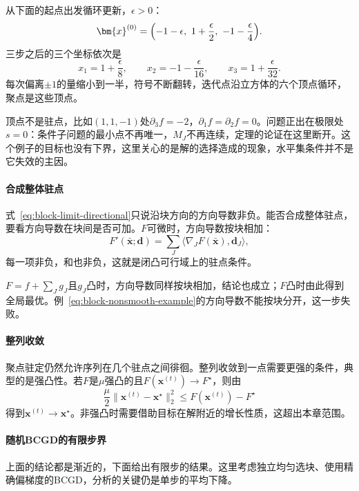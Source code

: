 从下面的起点出发循环更新，$\epsilon>0$：
\[
 \bm{x}^{(0)}=\Bigl(-1-\epsilon,\ 1+\frac{\epsilon}{2},\ -1-\frac{\epsilon}{4}\Bigr).
\]
三步之后的三个坐标依次是
\[
 x_1=1+\frac{\epsilon}{8},\qquad x_2=-1-\frac{\epsilon}{16},\qquad x_3=1+\frac{\epsilon}{32}.
\]
每次偏离$\pm1$的量缩小到一半，符号不断翻转，迭代点沿立方体的六个顶点循环，聚点是这些顶点。

顶点不是驻点，比如$(1,1,-1)$处$\partial_3f=-2$，$\partial_1f=\partial_2f=0$。问题正出在极限处$s=0$：条件子问题的最小点不再唯一，$M_J$不再连续，定理的论证在这里断开。这个例子的目标也没有下界，这里关心的是解的选择造成的现象，水平集条件并不是它失效的主因。

\paragraph{合成整体驻点}
式~\eqref{eq:block-limit-directional}只说沿块方向的方向导数非负。能否合成整体驻点，要看方向导数在块间是否可加。$F$可微时，方向导数按块相加：
\[
 F'(\bar{\bm{x}};\bm{d})=\sum_J\langle\nabla_JF(\bar{\bm{x}}),\bm{d}_J\rangle ,
\]
每一项非负，和也非负，这就是闭凸可行域上的驻点条件。

$F=f+\sum_Jg_J$且$g_J$凸时，方向导数同样按块相加，结论也成立；$F$凸时由此得到全局最优。例~\eqref{eq:block-nonsmooth-example}的方向导数不能按块分开，这一步失败。

\paragraph{整列收敛}
聚点驻定仍然允许序列在几个驻点之间徘徊。整列收敛到一点需要更强的条件，典型的是强凸性。若$F$是$\mu$强凸的且$F(\bm{x}^{(t)})\to F^\star$，则由
\[
 \frac{\mu}{2}\lVert\bm{x}^{(t)}-\bm{x}^\star\rVert_2^2\leq F(\bm{x}^{(t)})-F^\star
\]
得到$\bm{x}^{(t)}\to\bm{x}^\star$。非强凸时需要借助目标在解附近的增长性质，这超出本章范围。

\paragraph{随机BCGD的有限步界}
上面的结论都是渐近的，下面给出有限步的结果。这里考虑独立均匀选块、使用精确偏梯度的BCGD，分析的关键仍是单步的平均下降。

